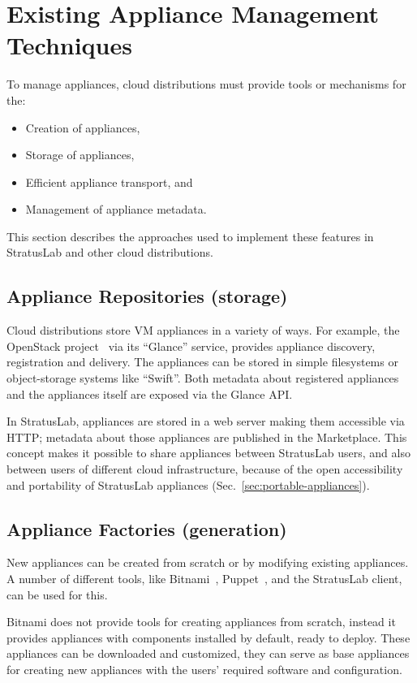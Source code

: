 \section{Existing Appliance Management Techniques}
\label{sec:other-approaches}

To manage appliances, cloud distributions must provide tools or
mechanisms for the:
\begin{itemize}
\item Creation of appliances,
\item Storage of appliances,
\item Efficient appliance transport, and
\item Management of appliance metadata.
\end{itemize}
This section describes the approaches used to implement these features
in StratusLab and other cloud distributions.

\subsection{Appliance Repositories (storage)}

Cloud distributions store VM appliances in a variety of ways. 
For example, the OpenStack project~\cite{openstack} 
via its ``Glance'' service, provides appliance discovery, registration and delivery.
The appliances can be stored in simple filesystems or 
object-storage systems like ``Swift''\@. Both metadata about registered appliances 
and the appliances itself are exposed via the Glance API\@.

In StratusLab, appliances are stored in a web server making them accessible via HTTP;
metadata about those appliances are published in the Marketplace\@. This concept makes it possible 
to share appliances between StratusLab users, and also between users of different cloud 
infrastructure, because of the open accessibility and portability of StratusLab appliances (Sec.~\ref{sec:portable-appliances}). 

\subsection{Appliance Factories (generation)}

New appliances can be created from scratch or by modifying existing appliances.
A number of different
tools, like Bitnami~\cite{bitnami}, Puppet~\cite{puppet}, and the StratusLab client,
can be used for this.

Bitnami does not provide tools for creating appliances from scratch,
instead it provides appliances with components installed by default, ready to deploy.
These appliances can be downloaded and customized, they can serve as 
base appliances for creating new appliances with the users' required software 
and configuration. 

